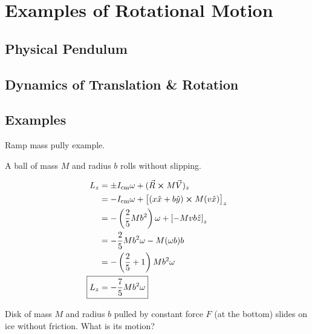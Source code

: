 \section{Examples of Rotational Motion}

\subsection{Physical Pendulum}


\subsection{Dynamics of Translation \& Rotation}


\subsection{Examples}

\begin{example}
	Ramp mass pully example.
\end{example}

\begin{example}
	A ball of mass $M$ and radius $b$ rolls without slipping.
\end{example}

\begin{sol}
	\begin{align}
		L_z &= \pm I_\mathrm{cm} \omega + (\vec R \cross M\vec V)_z\\
		&=  - I_\mathrm{cm} \omega + \left[(x \hat x + b \hat y) \cross M (v \hat x)\right]_z\\
		&= - \left(\frac{2}{5} Mb^2\right) \omega + \left[-Mvb \hat z\right]_z\\
		&= - \frac{2}{5} Mb^2 \omega - M(\omega b) b\\
		&= -\left(\frac{2}{5} + 1\right) Mb^2\omega\\
		\Aboxed{L_z &= - \frac{7}{5} Mb^2 \omega}
	\end{align}
\end{sol}

\begin{example}
	Disk of mass $M$ and radius $b$ pulled by constant force $F$ (at the bottom) slides on ice without friction. What is its motion?
\end{example}

